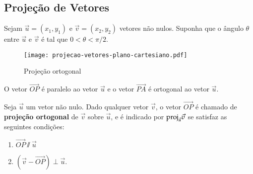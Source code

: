 \subsection{Proje\c{c}\~ao de Vetores} %
\label{sub:projecao_de_vetores}
Sejam $\vec{u} = (x_1, y_1)$ e $\vec{v} = (x_2, y_2)$ vetores n\~ao nulos. Suponha que o \^angulo $\theta$ entre $\vec{u}$ e $\vec{v}$ \'e tal que $0 < \theta < \pi/2$.
\begin{figure}[!h]
  \centering
  \caption{Proje\c{c}\~ao ortogonal}
  \texttt{[image: projecao-vetores-plano-cartesiano.pdf]}


    
\end{figure}

O vetor $\vec{OP}$ \'e paralelo ao vetor $\vec{u}$ e o vetor $\vec{PA}$ \'e ortogonal ao vetor $\vec{u}$.

\begin{definicao}\label{projecao_ortogonal}
  Seja $\vec{u}$ um vetor n\~ao nulo. Dado qualquer vetor $\vec{v}$, o vetor $\vec{OP}$ \'e chamado de \textbf{proje\c{c}\~ao ortogonal} de $\vec{v}$ sobre $\vec{u}$, e \'e indicado por ${\rm proj}_{\vec{u}}\vec{v}$ se satisfaz as seguintes condi\c{c}\~oes:
  \begin{enumerate}
    \item $\vec{OP} \varparallel\vec{u}$
    \item $(\vec{v} - \vec{OP}) \perp \vec{u}$.
  \end{enumerate}
\end{definicao}

